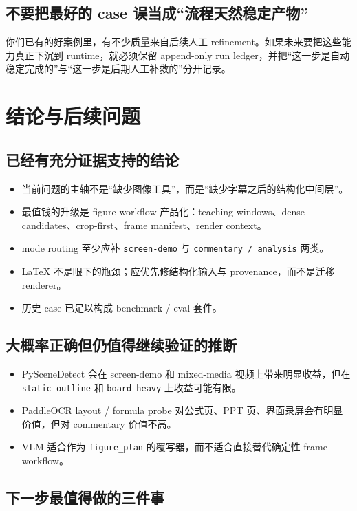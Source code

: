\documentclass[a4paper]{article}
\begin{document}
\subsection{不要把最好的 case 误当成“流程天然稳定产物”}

你们已有的好案例里，有不少质量来自后续人工 refinement。如果未来要把这些能力真正下沉到 runtime，就必须保留 append-only run ledger，并把“这一步是自动稳定完成的”与“这一步是后期人工补救的”分开记录。

\section{结论与后续问题}

\subsection{已经有充分证据支持的结论}

\begin{itemize}
\item 当前问题的主轴不是“缺少图像工具”，而是“缺少字幕之后的结构化中间层”。
\item 最值钱的升级是 figure workflow 产品化：teaching windows、dense candidates、crop-first、frame manifest、render context。
\item mode routing 至少应补 \texttt{screen-demo} 与 \texttt{commentary / analysis} 两类。
\item LaTeX 不是眼下的瓶颈；应优先修结构化输入与 provenance，而不是迁移 renderer。
\item 历史 case 已足以构成 benchmark / eval 套件。
\end{itemize}

\subsection{大概率正确但仍值得继续验证的推断}

\begin{itemize}
\item PySceneDetect 会在 screen-demo 和 mixed-media 视频上带来明显收益，但在 \texttt{static-outline} 和 \texttt{board-heavy} 上收益可能有限。
\item PaddleOCR layout / formula probe 对公式页、PPT 页、界面录屏会有明显价值，但对 commentary 价值不高。
\item VLM 适合作为 \texttt{figure\_plan} 的覆写器，而不适合直接替代确定性 frame workflow。
\end{itemize}

\subsection{下一步最值得做的三件事}
\end{document}
